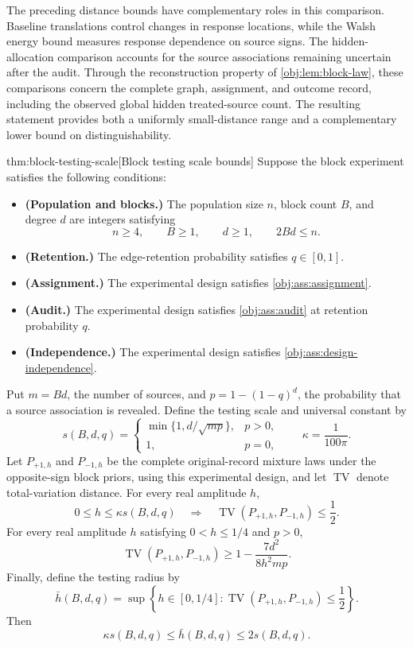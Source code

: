 \documentclass[11pt]{article}
\begin{document}
The preceding distance bounds have complementary roles in this comparison. Baseline translations control changes in response locations, while the Walsh energy bound measures response dependence on source signs. The hidden-allocation comparison accounts for the source associations remaining uncertain after the audit. Through the reconstruction property of \cref{obj:lem:block-law}, these comparisons concern the complete graph, assignment, and outcome record, including the observed global hidden treated-source count. The resulting statement provides both a uniformly small-distance range and a complementary lower bound on distinguishability.

\begin{theoremv}{thm:block-testing-scale}[Block testing scale bounds]
Suppose the block experiment satisfies the following conditions:
\begin{itemize}
\item \textbf{(Population and blocks.)} The population size \(n\), block count \(B\), and degree \(d\) are integers satisfying
\[
n\ge4,\qquad B\ge1,\qquad d\ge1,\qquad 2Bd\le n.
\]
\item \textbf{(Retention.)} The edge-retention probability satisfies \(q\in[0,1]\).
\item \textbf{(Assignment.)} The experimental design satisfies \cref{obj:ass:assignment}.
\item \textbf{(Audit.)} The experimental design satisfies \cref{obj:ass:audit} at retention probability \(q\).
\item \textbf{(Independence.)} The experimental design satisfies \cref{obj:ass:design-independence}.
\end{itemize}
Put \(m=Bd\), the number of sources, and \(p=1-(1-q)^d\), the probability that a source association is revealed. Define the testing scale and universal constant by
\[
s(B,d,q)=
\begin{cases}
\min\{1,d/\sqrt{mp}\},&p>0,\\
1,&p=0,
\end{cases}
\qquad
\kappa=\frac{1}{100\pi}.
\]
Let \(P_{+1,h}\) and \(P_{-1,h}\) be the complete original-record mixture laws under the opposite-sign block priors, using this experimental design, and let \(\operatorname{TV}\) denote total-variation distance. For every real amplitude \(h\),
\[
0\le h\le\kappa s(B,d,q)
\quad\Longrightarrow\quad
\operatorname{TV}(P_{+1,h},P_{-1,h})\le\frac12.
\]
For every real amplitude \(h\) satisfying \(0<h\le1/4\) and \(p>0\),
\[
\operatorname{TV}(P_{+1,h},P_{-1,h})
\ge 1-\frac{7d^2}{8h^2mp}.
\]
Finally, define the testing radius by
\[
\bar h(B,d,q)
=
\sup\left\{
h\in[0,1/4]:
\operatorname{TV}(P_{+1,h},P_{-1,h})\le\frac12
\right\}.
\]
Then
\[
\kappa s(B,d,q)\le\bar h(B,d,q)\le2s(B,d,q).
\]
\end{theoremv}
\end{document}
